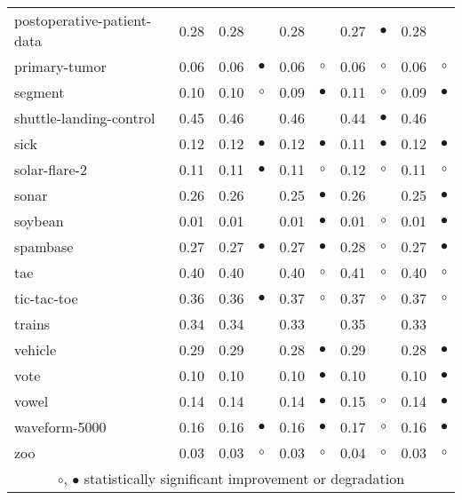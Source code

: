 {\begin{longtable}{lrr@{\hspace{0.1cm}}cr@{\hspace{0.1cm}}cr@{\hspace{0.1cm}}cr@{\hspace{0.1cm}}c}
postoperative-patient-data & 0.28 & 0.28 &           & 0.28 &            & 0.27 & $\bullet$ & 0.28 &           \\
primary-tumor & 0.06 & 0.06 & $\bullet$ & 0.06 &    $\circ$ & 0.06 &   $\circ$ & 0.06 &    $\circ$\\
segment & 0.10 & 0.10 &   $\circ$ & 0.09 &  $\bullet$ & 0.11 &   $\circ$ & 0.09 &  $\bullet$\\
shuttle-landing-control & 0.45 & 0.46 &           & 0.46 &            & 0.44 & $\bullet$ & 0.46 &           \\
sick & 0.12 & 0.12 & $\bullet$ & 0.12 &  $\bullet$ & 0.11 & $\bullet$ & 0.12 &  $\bullet$\\
solar-flare-2 & 0.11 & 0.11 & $\bullet$ & 0.11 &    $\circ$ & 0.12 &   $\circ$ & 0.11 &    $\circ$\\
sonar & 0.26 & 0.26 &           & 0.25 &  $\bullet$ & 0.26 &           & 0.25 &  $\bullet$\\
soybean & 0.01 & 0.01 &           & 0.01 &  $\bullet$ & 0.01 &   $\circ$ & 0.01 &  $\bullet$\\
spambase & 0.27 & 0.27 & $\bullet$ & 0.27 &  $\bullet$ & 0.28 &   $\circ$ & 0.27 &  $\bullet$\\
tae & 0.40 & 0.40 &           & 0.40 &    $\circ$ & 0.41 &   $\circ$ & 0.40 &    $\circ$\\
tic-tac-toe & 0.36 & 0.36 & $\bullet$ & 0.37 &    $\circ$ & 0.37 &   $\circ$ & 0.37 &    $\circ$\\
trains & 0.34 & 0.34 &           & 0.33 &            & 0.35 &           & 0.33 &           \\
vehicle & 0.29 & 0.29 &           & 0.28 &  $\bullet$ & 0.29 &           & 0.28 &  $\bullet$\\
vote & 0.10 & 0.10 &           & 0.10 &  $\bullet$ & 0.10 &           & 0.10 &  $\bullet$\\
vowel & 0.14 & 0.14 &           & 0.14 &  $\bullet$ & 0.15 &   $\circ$ & 0.14 &  $\bullet$\\
waveform-5000 & 0.16 & 0.16 & $\bullet$ & 0.16 &  $\bullet$ & 0.17 &   $\circ$ & 0.16 &  $\bullet$\\
zoo & 0.03 & 0.03 &   $\circ$ & 0.03 &    $\circ$ & 0.04 &   $\circ$ & 0.03 &    $\circ$\\
\hline
\multicolumn{10}{c}{$\circ$, $\bullet$ statistically significant improvement or degradation}\\
\end{longtable} \footnotesize \par}